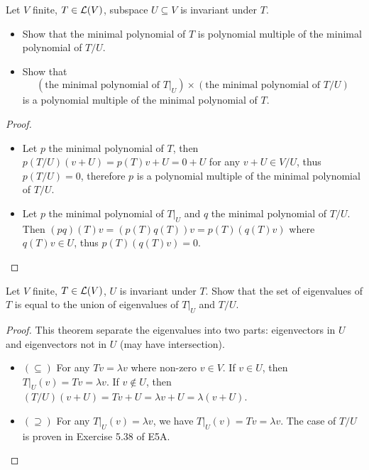 \documentclass[../main.tex]{subfiles}
\begin{document}
\setcounter{exercise}{24}
\begin{exercise}
  Let $V$ finite, $T \in \mathcal{L}(V)$, subspace $U \subseteq V$ is invariant under $T$.
  \begin{itemize}
    \item Show that the minimal polynomial of $T$ is polynomial multiple of
          the minimal polynomial of $T/U$.
    \item Show that
          \[
          (\text{the minimal polynomial of } T\big|_U) \times (\text{the minimal polynomial of } T/U)
          \]
          is a polynomial multiple of the minimal polynomial of $T$.
  \end{itemize}
\end{exercise}
\begin{proof}
  \begin{itemize}
    \item Let $p$ the minimal polynomial of $T$, then $p(T/U)(v + U) = p(T)v + U = 0 + U$ for
          any $v + U \in V/U$, thus $p(T/U) = 0$, therefore $p$ is a polynomial multiple of
          the minimal polynomial of $T/U$.
    \item Let $p$ the minimal polynomial of $T\big|_U$ and $q$ the minimal polynomial of $T/U$.
          Then $(pq)(T)v = (p(T)q(T))v = p(T)(q(T)v)$ where $q(T)v \in U$,
          thus $p(T)(q(T)v) = 0$.
  \end{itemize}
\end{proof}

\begin{exercise}
  Let $V$ finite, $T \in \mathcal{L}(V)$, $U$ is invariant under $T$.
  Show that the set of eigenvalues of $T$ is equal to the
  union of eigenvalues of $T\big|_U$ and $T/U$.
\end{exercise}
\begin{proof}
  This theorem separate the eigenvalues into two parts: eigenvectors
  in $U$ and eigenvectors not in $U$ (may have intersection).
  \begin{itemize}
    \item $(\subseteq)$ For any $Tv = \lambda v$ where non-zero $v \in V$.
          If $v \in U$, then $T\big|_U(v) = Tv = \lambda v$.
          If $v \notin U$, then $(T/U)(v + U) = Tv + U = \lambda v + U = \lambda (v + U)$.
    \item $(\supseteq)$ For any $T\big|_U(v) = \lambda v$, we have $T\big|_U(v) = Tv = \lambda v$.
          The case of $T/U$ is proven in Exercise 5.38 of E5A.
  \end{itemize}
\end{proof}
\end{document}
